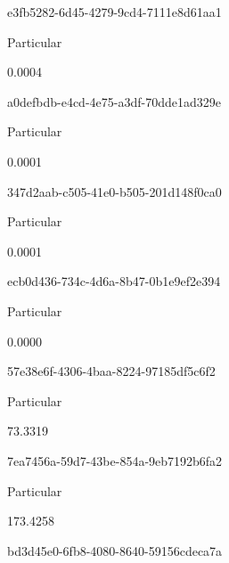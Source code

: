 \documentclass[
  11pt,
  a4paper,
  DIV=11,
  numbers=noendperiod]{scrartcl}
\begin{document}
e3fb5282-6d45-4279-9cd4-7111e8d61aa1

\n      

Particular

\n      

0.0004

\n    

\n    

\n      

a0defbdb-e4cd-4e75-a3df-70dde1ad329e

\n      

Particular

\n      

0.0001

\n    

\n    

\n      

347d2aab-c505-41e0-b505-201d148f0ca0

\n      

Particular

\n      

0.0001

\n    

\n    

\n      

ecb0d436-734c-4d6a-8b47-0b1e9ef2e394

\n      

Particular

\n      

0.0000

\n    

\n    

\n      

57e38e6f-4306-4baa-8224-97185df5c6f2

\n      

Particular

\n      

73.3319

\n    

\n    

\n      

7ea7456a-59d7-43be-854a-9eb7192b6fa2

\n      

Particular

\n      

173.4258

\n    

\n    

\n      

bd3d45e0-6fb8-4080-8640-59156cdeca7a
\end{document}
